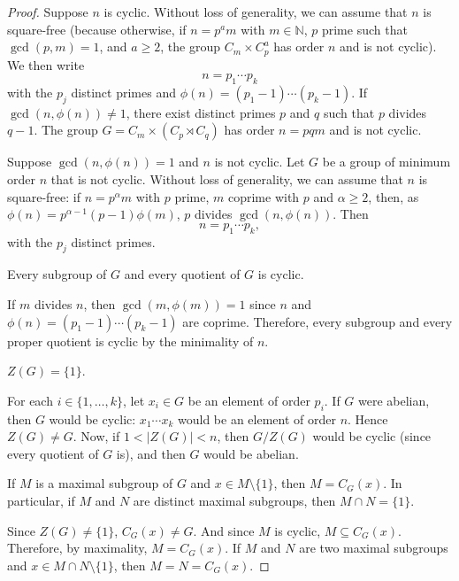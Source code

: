 \begin{proof}
    Suppose $n$ is cyclic. Without loss of generality, we can assume that $n$ is square-free (because otherwise, if $n=p^am$ with $m\in\mathbb{N}$, $p$ prime such that $\gcd(p,m)=1$, and $a\geq2$, the group $C_m\times C_p^a$ has order $n$ and is not cyclic). We then write
    \[
        n=p_1\cdots p_k
    \]
    with the $p_j$ distinct primes and $\phi(n)=(p_1-1)\cdots(p_k-1)$. If $\gcd(n,\phi(n))\ne1$, there exist distinct primes $p$ and $q$ such that $p$ divides $q-1$. The group $G= C_m\times (C_p\rtimes C_q)$ has order $n=pqm$ and is not cyclic.

    Suppose $\gcd(n,\phi(n))=1$ and $n$ is not cyclic. Let $G$ be a group of minimum order $n$ that is not cyclic.
    Without loss of generality, we can assume that $n$ is square-free: if $n=p^\alpha m$ with $p$ prime, $m$ coprime with $p$ and $\alpha\geq2$, then, as $\phi(n)=p^{\alpha-1}(p-1)\phi(m)$, $p$ divides 
    $\gcd(n,\phi(n))$. Then
    \[
        n=p_1\cdots p_k,
    \]
    with the $p_j$ distinct primes.

    \begin{claim}
    Every subgroup of $G$ and every quotient of $G$ is cyclic.
    \end{claim}

    If $m$ divides $n$, then $\gcd(m,\phi(m))=1$ since $n$ and $\phi(n)=(p_1-1)\cdots(p_k-1)$ are coprime. Therefore, every subgroup and every proper quotient is cyclic by the minimality of $n$.

    \begin{claim}
    $Z(G)=\{1\}$.
    \end{claim}

    For each $i\in\{1,\dots,k\}$, let $x_i\in G$ be an element of order $p_i$. If $G$ were abelian, then $G$ would be cyclic: $x_1\cdots x_k$ would be an element of order $n$. Hence $Z(G)\ne G$. Now, if $1<|Z(G)|<n$, then $G/Z(G)$ would be cyclic (since every quotient of $G$ is), and then $G$ would be abelian.

    \begin{claim}
    If $M$ is a maximal subgroup of $G$ and $x\in M\setminus\{1\}$, then $M=C_G(x)$. In particular, if $M$ and $N$ are distinct maximal subgroups, then $M\cap N=\{1\}$.
    \end{claim}

    Since $Z(G)\ne\{1\}$, $C_G(x)\ne G$. And since $M$ is cyclic, $M\subseteq C_G(x)$. Therefore, by maximality, $M=C_G(x)$. If $M$ and $N$ are two maximal subgroups and $x\in M\cap N\setminus\{1\}$, then $M=N=C_G(x)$.


\end{proof}

